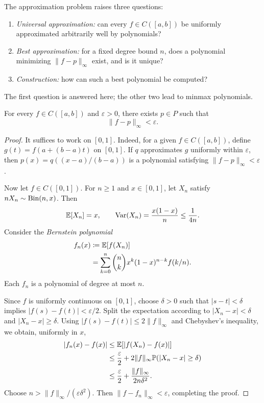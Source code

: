 The approximation problem raises three questions:
\begin{enumerate}[label=(\roman*)]
 \item \emph{Universal approximation:} can every
 $f\in C([a, b])$ be uniformly approximated arbitrarily well by polynomials?
 \item \emph{Best approximation:} for a fixed degree bound $n$,
 does a polynomial minimizing $\|f-p\|_\infty$ exist, and is it unique?
 \item \emph{Construction:} how can such a best polynomial be computed?
\end{enumerate}
The first question is answered here; the other two lead to
minmax polynomials.

\begin{theorem}
For every $f\in C([a, b])$ and $\varepsilon>0$, there exists
$p\in P$ such that
\[
 \|f-p\|_\infty<\varepsilon.
\]
\end{theorem}
\begin{proof}
It suffices to work on $[0, 1]$. Indeed, for a given
$f\in C([a, b])$, define $g(t)=f(a+(b-a)t)$ on $[0, 1]$.
If $q$ approximates $g$ uniformly within $\varepsilon$,
then $p(x)=q((x-a)/(b-a))$ is a polynomial satisfying
$\|f-p\|_\infty<\varepsilon$.

Now let $f\in C([0, 1])$. For $n\ge1$ and $x\in[0, 1]$,
let $X_n$ satisfy $nX_n\sim\operatorname{Bin}(n, x)$.
Then
\[
 \mathbb{E}[X_n]=x,
 \qquad \operatorname{Var}(X_n)=\frac{x(1-x)}n
 \le\frac1{4n}.
\]
Consider the \emph{Bernstein polynomial}
\[
 \begin{aligned}
 f_n(x)
 &\coloneqq\mathbb{E}[f(X_n)]\\
 &=\sum_{k=0}^n\binom nk x^k(1-x)^{n-k}f(k/n).
 \end{aligned}
\]
Each $f_n$ is a polynomial of degree at most $n$.

Since $f$ is uniformly continuous on $[0, 1]$, choose
$\delta>0$ such that
$|s-t|<\delta$ implies $|f(s)-f(t)|<\varepsilon/2$.
Split the expectation according to
$|X_n-x|<\delta$ and $|X_n-x|\ge\delta$. Using
$|f(s)-f(t)|\le2\|f\|_\infty$ and Chebyshev's inequality,
we obtain, uniformly in $x$,
\[
 \begin{aligned}
 |f_n(x)-f(x)|
 &\le\mathbb{E}[|f(X_n)-f(x)|]\\
 &\le\frac\varepsilon2
    +2\|f\|_\infty\mathbb{P}(|X_n-x|\ge\delta)\\
 &\le\frac\varepsilon2
    +\frac{\|f\|_\infty}{2n\delta^2}.
 \end{aligned}
\]
Choose $n>\|f\|_\infty/(\varepsilon\delta^2)$.
Then $\|f-f_n\|_\infty<\varepsilon$, completing the proof.
\end{proof}
